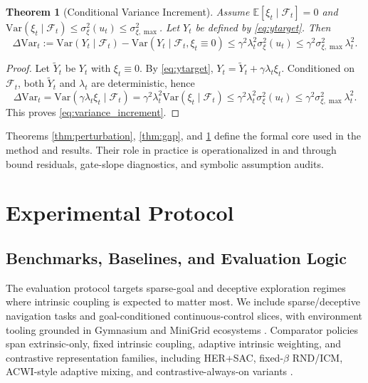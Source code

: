 \documentclass{article} %
\newtheorem{theorem}{Theorem}[section]
\begin{document}
\begin{theorem}[Conditional Variance Increment]
\label{thm:variance}
Assume $\mathbb{E}[\xi_t\mid\mathcal{F}_t]=0$ and
$\mathrm{Var}(\xi_t\mid\mathcal{F}_t)\le \sigma^2_{\xi}(u_t)\le\sigma^2_{\xi,\max}$.
Let $Y_t$ be defined by \eqref{eq:ytarget}. Then
\begin{equation}
\label{eq:variance_increment}
\Delta\mathrm{Var}_t:=\mathrm{Var}(Y_t\mid\mathcal{F}_t)-\mathrm{Var}(Y_t\mid\mathcal{F}_t,\xi_t\equiv0)
\le \gamma^2\lambda_t^2\sigma^2_{\xi}(u_t)
\le \gamma^2\sigma^2_{\xi,\max}\lambda_t^2.
\end{equation}
\end{theorem}
\begin{proof}
Let $\widetilde{Y}_t$ be $Y_t$ with $\xi_t\equiv0$. By \eqref{eq:ytarget},
$Y_t=\widetilde{Y}_t+\gamma\lambda_t\xi_t$.
Conditioned on $\mathcal{F}_t$, both $\widetilde{Y}_t$ and $\lambda_t$ are deterministic, hence
\[
\Delta\mathrm{Var}_t=\mathrm{Var}(\gamma\lambda_t\xi_t\mid\mathcal{F}_t)
=\gamma^2\lambda_t^2\mathrm{Var}(\xi_t\mid\mathcal{F}_t)
\le\gamma^2\lambda_t^2\sigma^2_{\xi}(u_t)
\le\gamma^2\sigma^2_{\xi,\max}\lambda_t^2.
\]
This proves \eqref{eq:variance_increment}.
\end{proof}

Theorems \ref{thm:perturbation}, \ref{thm:gap}, and \ref{thm:variance} define the formal core used in the method and results. Their role in practice is operationalized in  and  through bound residuals, gate-slope diagnostics, and symbolic assumption audits.

\section{Experimental Protocol}
\label{sec:exp}

\subsection{Benchmarks, Baselines, and Evaluation Logic}

The evaluation protocol targets sparse-goal and deceptive exploration regimes where intrinsic coupling is expected to matter most. We include sparse/deceptive navigation tasks and goal-conditioned continuous-control slices, with environment tooling grounded in Gymnasium and MiniGrid ecosystems \citep{ref_gymnasium_2023, ref_minigrid_2023}. Comparator policies span extrinsic-only, fixed intrinsic coupling, adaptive intrinsic weighting, and contrastive representation families, including HER+SAC, fixed-$\beta$ RND/ICM, ACWI-style adaptive mixing, and contrastive-always-on variants \citep{arxiv1707_01495, arxiv1801_01290, arxiv1810_12894, arxiv1703_01310, arxiv2602_24081, arxiv2206_07568}.
\end{document}
